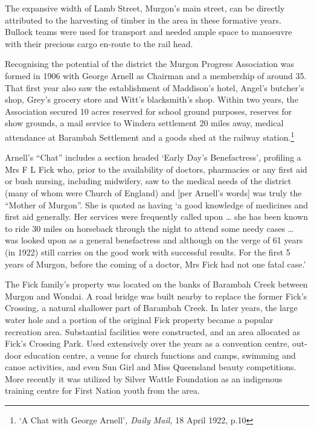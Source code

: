 The expansive width of Lamb Street, Murgon's main street, can be directly attributed to the harvesting of timber in the area in these formative years. Bullock teams were used for transport and needed ample space to manoeuvre with their precious cargo en-route to the rail head.



Recognising the potential of the district the Murgon Progress Association was formed in 1906 with George Arnell as Chairman and a membership of around 35. That first year also saw the establishment of Maddison's hotel, Angel's butcher's shop, Grey's grocery store and Witt's blacksmith's shop. Within two years, the Association secured 10 acres reserved for school ground purposes, reserves for show grounds, a mail service to Windera settlement 20 miles away, medical attendance at Barambah Settlement and a goods shed at the railway station.\footnote{`A Chat with George Arnell'\emph{, Daily Mail,} 18 April 1922, p.10}


Arnell's ``Chat'' includes a section headed `Early Day's Benefactress', profiling a Mrs F L Fick who, prior to the availability of doctors, pharmacies or any first aid or bush nursing, including midwifery, saw to the medical needs of the district (many of whom were Church of England) and {[}per Arnell's words{]} was truly the ``Mother of Murgon''. She is quoted as having `a good knowledge of medicines and first aid generally. Her services were frequently called upon \ldots{} she has been known to ride 30 miles on horseback through the night to attend some needy cases \ldots{} was looked upon as a general benefactress and although on the verge of 61 years (in 1922) still carries on the good work with successful results. For the first 5 years of Murgon, before the coming of a doctor, Mrs Fick had not one fatal case.'



The Fick family's property was located on the banks of Barambah Creek between Murgon and Wondai. A road bridge was built nearby to replace the former Fick's Crossing\emph{,} a natural shallower part of Barambah Creek. In later years, the large water hole and a portion of the original Fick property became a popular recreation area. Substantial facilities were constructed, and an area allocated as Fick's Crossing Park\emph{.} Used extensively over the years as a convention centre, out-door education centre, a venue for church functions and camps, swimming and canoe activities, and even Sun Girl and Miss Queensland beauty competitions. More recently it was utilized by Silver Wattle Foundation as an indigenous training centre for First Nation youth from the area.




